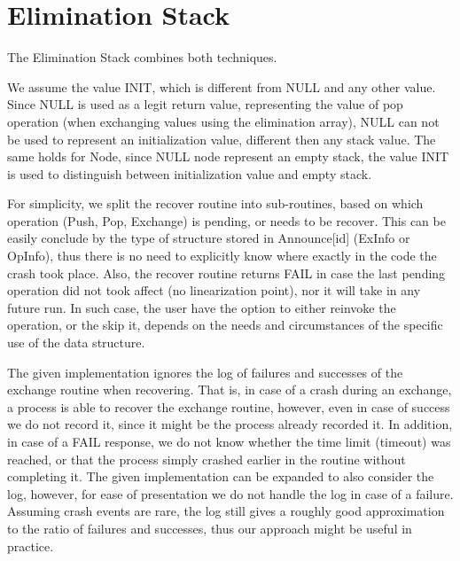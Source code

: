 \section{Elimination Stack}

The Elimination Stack combines both techniques.

We assume the value INIT, which is different from NULL and any other value. Since NULL is used as a legit return value, representing the value of pop operation (when exchanging values using the elimination array), NULL can not be used to represent an initialization value, different then any stack value. The same holds for Node, since NULL node represent an empty stack, the value INIT is used to distinguish between initialization value and empty stack.

For simplicity, we split the recover routine into sub-routines, based on which operation (Push, Pop, Exchange) is pending, or needs to be recover. This can be easily conclude by the type of structure stored in Announce[id] (ExInfo or OpInfo), thus there is no need to explicitly know where exactly in the code the crash took place. Also, the recover routine returns FAIL in case the last pending operation did not took affect (no linearization point), nor it will take in any future run. In such case, the user have the option to either reinvoke the operation, or the skip it, depends on the needs and circumstances of the specific use of the data structure.

The given implementation ignores the log of failures and successes of the exchange routine when recovering. That is, in case of a crash during an exchange, a process is able to recover the exchange routine, however, even in case of success we do not record it, since it might be the process already recorded it. In addition, in case of a FAIL response, we do not know whether the time limit (timeout) was reached, or that the process simply crashed earlier in the routine without completing it. The given implementation can be expanded to also consider the log, however, for ease of presentation we do not handle the log in case of a failure. Assuming crash events are rare, the log still gives a roughly good approximation to the ratio of failures and successes, thus our approach might be useful in practice.


